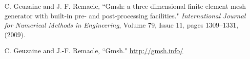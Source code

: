 \documentclass[A4]{article}
\begin{document}
\begin{thebibliography}{99}

	 C. Geuzaine and J.-F. Remacle, ``Gmsh: a three-dimensional finite element mesh generator with built-in pre- and post-processing facilities." \textit{International Journal for Numerical Methods in Engineering}, Volume 79, Issue 11, pages 1309--1331, (2009).
	
	  C. Geuzaine and J.-F. Remacle, ``Gmsh." \url{http://gmsh.info/}
	
\end{thebibliography}
\end{document}
